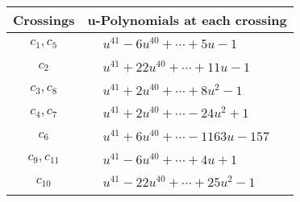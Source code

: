 \documentclass[1p]{elsarticle_modified}
\theoremstyle{definition}
\begin{document}
\begin{tabular}{m{50pt}|m{274pt}}
Crossings & \hspace{64pt}u-Polynomials at each crossing \\
\hline $$\begin{aligned}c_{1},c_{5}\end{aligned}$$&$\begin{aligned}
&u^{41}-6 u^{40}+\cdots+5 u-1
\end{aligned}$\\
\hline $$\begin{aligned}c_{2}\end{aligned}$$&$\begin{aligned}
&u^{41}+22 u^{40}+\cdots+11 u-1
\end{aligned}$\\
\hline $$\begin{aligned}c_{3},c_{8}\end{aligned}$$&$\begin{aligned}
&u^{41}+2 u^{40}+\cdots+8 u^2-1
\end{aligned}$\\
\hline $$\begin{aligned}c_{4},c_{7}\end{aligned}$$&$\begin{aligned}
&u^{41}+2 u^{40}+\cdots-24 u^2+1
\end{aligned}$\\
\hline $$\begin{aligned}c_{6}\end{aligned}$$&$\begin{aligned}
&u^{41}+6 u^{40}+\cdots-1163 u-157
\end{aligned}$\\
\hline $$\begin{aligned}c_{9},c_{11}\end{aligned}$$&$\begin{aligned}
&u^{41}-6 u^{40}+\cdots+4 u+1
\end{aligned}$\\
\hline $$\begin{aligned}c_{10}\end{aligned}$$&$\begin{aligned}
&u^{41}-22 u^{40}+\cdots+25 u^2-1
\end{aligned}$\\
\hline
\end{tabular}\\~\\
\newpage\renewcommand{\arraystretch}{1}
\end{document}
